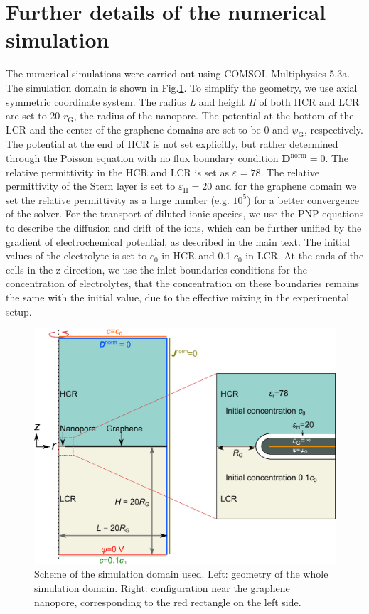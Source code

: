 \documentclass[manuscript=suppinfo,email=true, hyperref=true, keywords=false]{achemso}
\newcommand{\Fig}{Fig.}
\begin{document}
\pagebreak
\section{Further details of the numerical simulation }
\label{sec:numer}

The numerical simulations were carried out using COMSOL Multiphysics
5.3a. The simulation domain is shown in \Fig \ref{fig:scheme}. To
simplify the geometry, we use axial symmetric coordinate system. The
radius \textit{L} and height \textit{H} of both HCR and LCR are set to
20 $r_{\mathrm{G}}$, the radius of the nanopore. The potential at the
bottom of the LCR and the center of the graphene domains are set to be
0 and $\psi_{\mathrm{G}}$, respectively. The potential at the end of
HCR is not set explicitly, but rather determined through the Poisson
equation with no flux boundary condition
$\boldsymbol{D}^{\mathrm{norm}}=0$. The relative permittivity in the
HCR and LCR is set as $\varepsilon_{\mathrm{}}=78$. The relative
permittivity of the Stern layer is set to
$\varepsilon_{\mathrm{H}}=20$\cite{Conway_1951} and for the graphene
domain we set the relative permittivity as a large number
(e.g. $10^{5}$) for a better convergence of the solver.  For the
transport of diluted ionic species, we use the PNP equations to
describe the diffusion and drift of the ions, which can be further
unified by the gradient of electrochemical potential, as described in
the main text. The initial values of the electrolyte is set to $c_{0}$
in HCR and 0.1 $c_{0}$ in LCR. At the ends of the cells in the
z-direction, we use the inlet boundaries conditions for the
concentration of electrolytes, that the concentration on these
boundaries remains the same with the initial value, due to the
effective mixing in the experimental setup.

\begin{figure}[htbp]
  \centering
  \includegraphics[width=0.8\linewidth]{img/SI-numerical-1.png}
  \caption{Scheme of the simulation domain used. Left: geometry of the
    whole simulation domain. Right: configuration near the graphene
    nanopore, corresponding to the red rectangle on the left side.}
  \label{fig:scheme}
\end{figure}
\end{document}
